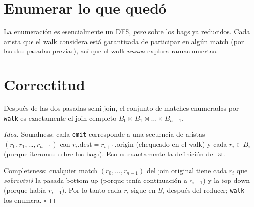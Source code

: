 \section{Enumerar lo que quedó}

\begin{algorithm}[H]
\caption{Yannakakis chain matcher}
\BlankLine
{}
\end{algorithm}

\noindent
La enumeración es esencialmente un DFS, \emph{pero} sobre los bags
ya reducidos. Cada arista que el walk considera está garantizada
de participar en algún match (por las dos pasadas previas), así que
el walk \emph{nunca} explora ramas muertas.

\section{Correctitud}

\begin{theorem}
Después de las dos pasadas semi-join, el conjunto de matches
enumerados por \texttt{walk} es exactamente el join completo
\(B_0 \bowtie B_1 \bowtie \dots \bowtie B_{n-1}\).
\end{theorem}

\begin{proof}[Idea]
Soundness: cada \texttt{emit} corresponde a una secuencia de
aristas \((r_0, r_1, \dots, r_{n-1})\) con \(r_i.\mathrm{dest} =
r_{i+1}.\mathrm{origin}\) (chequeado en el walk) y cada \(r_i \in
B_i\) (porque iteramos sobre los bags). Eso es exactamente la
definición de \(\bowtie\).

Completeness: cualquier match \((r_0, \dots, r_{n-1})\) del join
original tiene cada \(r_i\) que \emph{sobrevivió} la pasada bottom-up
(porque tenía continuación a \(r_{i+1}\)) y la top-down (porque
había \(r_{i-1}\)). Por lo tanto cada \(r_i\) sigue en \(B_i\)
después del reducer; \texttt{walk} los enumera. \(\square\)
\end{proof}

